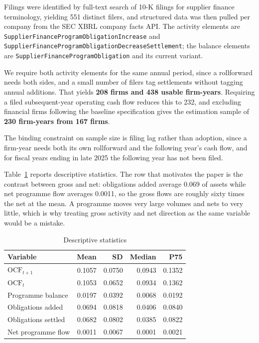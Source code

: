 \documentclass[conference,a4paper]{IEEEtran}
\begin{document}
Filings were identified by full-text search of 10-K filings for supplier finance
terminology, yielding 551 distinct filers, and structured data was then pulled
per company from the SEC XBRL company facts API. The activity elements are
\texttt{SupplierFinanceProgramObligationIncrease} and
\texttt{SupplierFinanceProgramObligationDecreaseSettlement}; the balance elements
are \texttt{SupplierFinanceProgramObligation} and its current variant.

We require both activity elements for the same annual period, since a
rollforward needs both sides, and a small number of filers tag settlements
without tagging annual additions. That yields \textbf{208 firms and 438 usable
firm-years}. Requiring a filed subsequent-year operating cash flow reduces this
to 232, and excluding financial firms following the baseline specification gives
the estimation sample of \textbf{230 firm-years from 167 firms}.

The binding constraint on sample size is filing lag rather than adoption, since
a firm-year needs both its own rollforward and the following year's cash flow,
and for fiscal years ending in late 2025 the following year has not been filed.

Table~\ref{tab:desc} reports descriptive statistics. The row that motivates the
paper is the contrast between gross and net: obligations added average 0.069 of
assets while net programme flow averages 0.0011, so the gross flows are roughly
sixty times the net at the mean. A programme moves very large volumes and nets
to very little, which is why treating gross activity and net direction as the
same variable would be a mistake.

\begin{table}[htbp]
\caption{Descriptive statistics}
\label{tab:desc}
\centering
\begin{tabular}{lrrrr}
\hline
\textbf{Variable} & \textbf{Mean} & \textbf{SD} & \textbf{Median} & \textbf{P75}\\
\hline
$\mathrm{OCF}_{t+1}$ & 0.1057 & 0.0750 & 0.0943 & 0.1352\\
$\mathrm{OCF}_{t}$ & 0.1053 & 0.0652 & 0.0934 & 0.1362\\
Programme balance & 0.0197 & 0.0392 & 0.0068 & 0.0192\\
Obligations added & 0.0694 & 0.0818 & 0.0406 & 0.0840\\
Obligations settled & 0.0682 & 0.0802 & 0.0385 & 0.0822\\
Net programme flow & 0.0011 & 0.0067 & 0.0001 & 0.0021\\
\hline
\end{tabular}
\end{table}
\end{document}
